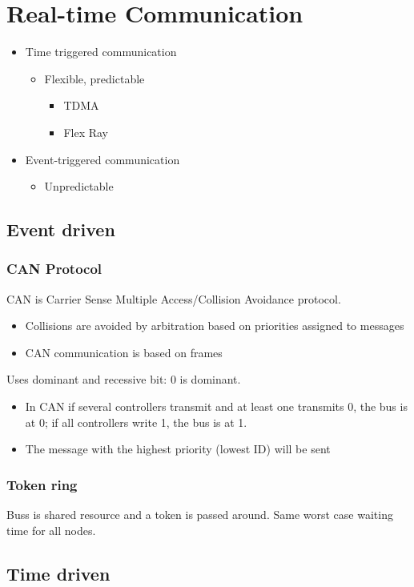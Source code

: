 \documentclass[a4paper]{article}
\begin{document}
\section{Real-time Communication}
\begin{itemize}
		\item Time triggered communication
				\begin{itemize}
						\item Flexible, predictable
								\begin{itemize}
										\item TDMA
										\item Flex Ray
								\end{itemize}
				\end{itemize}
		\item Event-triggered communication
				\begin{itemize}
						\item Unpredictable
				\end{itemize}
\end{itemize}
\subsection{Event driven}
\subsubsection{CAN Protocol}
CAN is Carrier Sense Multiple Access/Collision Avoidance protocol.
\begin{itemize}
		\item Collisions are avoided by arbitration based on priorities assigned
				to messages
		\item CAN communication is based on frames
\end{itemize}
Uses dominant and recessive bit: 0 is dominant.
\begin{itemize}
		\item In CAN if several controllers transmit and at least one transmits
				0, the bus is at 0; if all controllers write 1, the bus is at 1.
		\item The message with the highest priority (lowest ID) will be sent
\end{itemize}
\subsubsection{Token ring}
Buss is shared resource and a token is passed around. Same worst case waiting
time for all nodes.
\subsection{Time driven}
\end{document}
